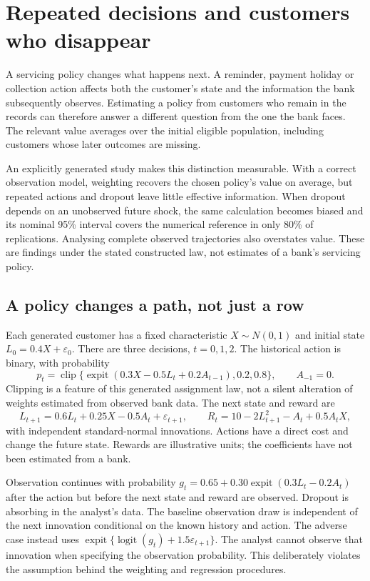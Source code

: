 \chapter{Repeated decisions and customers who disappear}
\label{gap29:servicing}

A servicing policy changes what happens next. A reminder, payment holiday or
collection action affects both the customer's state and the information the
bank subsequently observes. Estimating a policy from customers who remain in
the records can therefore answer a different question from the one the bank
faces. The relevant value averages over the initial eligible population,
including customers whose later outcomes are missing.

An explicitly generated study makes this distinction measurable. With a
correct observation model, weighting recovers the chosen policy's value on
average, but repeated actions and dropout leave little effective information.
When dropout depends on an unobserved future shock, the same calculation
becomes biased and its nominal 95\% interval covers the numerical reference
in only 80\% of replications. Analysing complete observed trajectories also
overstates value. These are findings under the stated constructed law,
not estimates of a bank's servicing policy.

\section{A policy changes a path, not just a row}
Each generated customer has a fixed characteristic $X\sim N(0,1)$ and initial
state $L_0=0.4X+\varepsilon_0$. There are three decisions, $t=0,1,2$.
The historical action is binary, with probability
\[
 p_t=\operatorname{clip}\{\operatorname{expit}(0.3X-0.5L_t+0.2A_{t-1}),0.2,0.8\},
 \qquad A_{-1}=0.
\]
Clipping is a feature of this generated assignment law, not a silent
alteration of weights estimated from observed bank data. The next state and
reward are
\[
 L_{t+1}=0.6L_t+0.25X-0.5A_t+\varepsilon_{t+1},\qquad
 R_t=10-2L_{t+1}^2-A_t+0.5A_tX,
\]
with independent standard-normal innovations. Actions have a direct cost
and change the future state. Rewards are illustrative units; the coefficients
have not been estimated from a bank.

Observation continues with probability
$g_t=0.65+0.30\operatorname{expit}(0.3L_t-0.2A_t)$ after the action but
before the next state and reward are observed. Dropout is absorbing in the
analyst's data. The baseline observation draw is independent of the next
innovation conditional on the known history and action. The adverse case
instead uses $\operatorname{expit}\{\operatorname{logit}(g_t)+1.5\varepsilon_{t+1}\}$.
The analyst cannot observe that innovation when specifying the observation
probability. This deliberately violates the assumption behind the weighting
and regression procedures.

